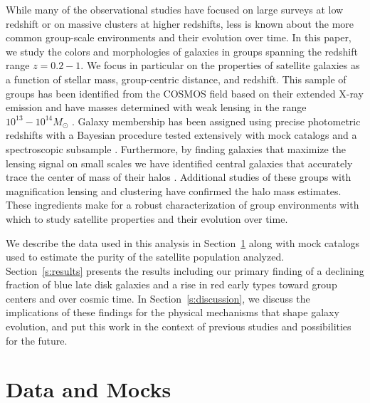 \documentclass[12pt]{emulateapj}
\begin{document}
While many of the observational studies have focused on large surveys
at low redshift or on massive clusters at higher redshifts, less is
known about the more common group-scale environments and their
evolution over time. In this paper, we study the colors and
morphologies of galaxies in groups spanning the redshift range
$z=0.2-1$. We focus in particular on the properties of satellite
galaxies as a function of stellar mass, group-centric distance, and
redshift. This sample of groups has been identified from the COSMOS
field \citep{Scoville2007a} based on their extended X-ray emission and
have masses determined with weak lensing in the range $10^{13}-10^{14}
M_{\odot}$ \citep{Leauthaud2010}. Galaxy membership has been assigned
using precise photometric redshifts with a Bayesian procedure
tested extensively with mock catalogs and a spectroscopic subsample
\citep{George2011}. Furthermore, by finding galaxies that maximize the
lensing signal on small scales we have identified central galaxies
that accurately trace the center of mass of their halos
\citep{George2012}. Additional studies of these
  groups with magnification lensing
\citep{Ford2012, Schmidt2012} and clustering \citep{Allevato2012} have
confirmed the halo mass estimates. These ingredients make for a robust
characterization of group environments with which to study satellite
properties and their evolution over time.

We describe the data used in this analysis in Section~\ref{s:data}
along with mock catalogs used to estimate the purity of the satellite
population analyzed. Section~\ref{s:results} presents the results
including our primary finding of a declining fraction of blue late
disk galaxies and a rise in red early types toward group centers and
over cosmic time. In Section~\ref{s:discussion}, we discuss the
implications of these findings for the physical mechanisms that shape
galaxy evolution, and put this work in the context of previous studies
and possibilities for the future.


\section{Data and Mocks}
\label{s:data}
\end{document}
